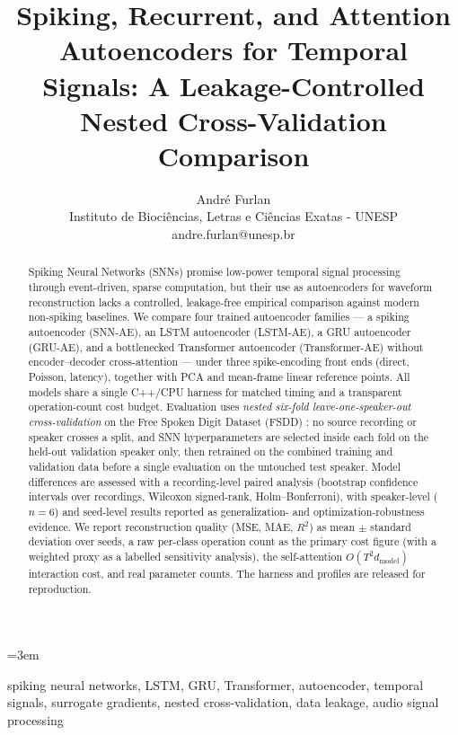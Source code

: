 \documentclass[conference]{IEEEtran}
\title{Spiking, Recurrent, and Attention Autoencoders for
Temporal Signals: A Leakage-Controlled Nested Cross-Validation Comparison}
\author{André Furlan\\Instituto de Biociências, Letras e Ciências Exatas - UNESP\\ andre.furlan@unesp.br}
\begin{document}
\maketitle
\sloppy
\emergencystretch=3em

\begin{abstract}

\par Spiking Neural Networks (SNNs) promise low-power temporal signal
processing through event-driven, sparse computation, but their use as
autoencoders for waveform reconstruction lacks a controlled, leakage-free
empirical comparison against modern non-spiking baselines. We compare four
trained autoencoder families --- a spiking autoencoder (SNN-AE), an LSTM
autoencoder (LSTM-AE), a GRU autoencoder (GRU-AE), and a bottlenecked
Transformer autoencoder (Transformer-AE) without encoder--decoder
cross-attention --- under three spike-encoding front ends (direct, Poisson,
latency), together with PCA and mean-frame linear reference points. All models
share a single C++/CPU harness \cite{furlan2026doi} for matched timing and a
transparent operation-count cost budget. Evaluation uses \emph{nested six-fold
leave-one-speaker-out cross-validation} on the Free Spoken Digit Dataset (FSDD)
\cite{jackson2018fsdd}: no source recording or speaker crosses a split, and SNN
hyperparameters are selected inside each fold on the held-out validation speaker
only, then retrained on the combined training and validation data before a
single evaluation on the untouched test speaker. Model differences are assessed
with a recording-level paired analysis (bootstrap confidence intervals over
recordings, Wilcoxon signed-rank, Holm--Bonferroni), with speaker-level
($n=6$) and seed-level results reported as generalization- and
optimization-robustness evidence. We report reconstruction quality
(MSE, MAE, $R^2$) as mean $\pm$ standard deviation over seeds, a raw
per-class operation count as the primary cost figure (with a weighted proxy
as a labelled sensitivity analysis), the self-attention $O(T^2 d_{\mathrm{model}})$
interaction cost, and real parameter counts. The harness and profiles are
released for reproduction.
\end{abstract}

\begin{IEEEkeywords}
spiking neural networks, LSTM, GRU, Transformer, autoencoder,
temporal signals, surrogate gradients, nested cross-validation,
data leakage, audio signal processing
\end{IEEEkeywords}
\end{document}
